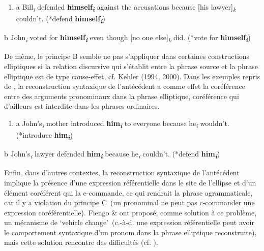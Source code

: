 \begin{enumerate}
\item \label{bkm:Ref305962748}a  Bill\textit{\textsubscript{i}} defended \textbf{himself}\textbf{\textit{\textsubscript{i}}} against the accusations because [his lawyer]\textit{\textsubscript{k}} couldn't. (*defend \textbf{himself}\textbf{\textit{\textsubscript{i}}}) 


\end{enumerate}
  b  John\textit{\textsubscript{i}} voted for \textbf{himself}\textbf{\textit{\textsubscript{i}}} even though [no one else]\textit{\textsubscript{k}} did. (*vote for \textbf{himself}\textbf{\textit{\textsubscript{i}}})

De même, le principe B semble ne pas s'appliquer dans certaines constructions elliptiques si la relation discursive qui s'établit entre la phrase source et la phrase elliptique est de type cause-effet, cf. Kehler (1994, 2000). Dans les exemples  repris de \citet{Kehler2000}, la reconstruction syntaxique de l'antécédent a comme effet la coréférence entre des arguments pronominaux dans la phrase elliptique, coréférence qui d'ailleurs est interdite dans les phrases ordinaires.


\begin{enumerate}
\item \label{bkm:Ref305962998}a  John's\textit{\textsubscript{i}} mother introduced \textbf{him}\textbf{\textit{\textsubscript{i}}} to everyone because he\textit{\textsubscript{i}} wouldn't. (*introduce \textbf{him}\textbf{\textit{\textsubscript{i}}}) 


\end{enumerate}
  b  John's\textit{\textsubscript{i}} lawyer defended \textbf{him}\textbf{\textit{\textsubscript{i}}} because he\textit{\textsubscript{i}} couldn't. (*defend \textbf{him}\textbf{\textit{\textsubscript{i}}})

Enfin, dans d'autres contextes, la reconstruction syntaxique de l'antécédent implique la présence d'une expression référentielle dans le site de l'ellipse et d'un élément coréférent qui la c-commande, ce qui rendrait la phrase agrammaticale, car il y a violation du principe C~(un pronominal ne peut pas c-commander une expression coréférentielle). Fiengo \& \citet{May1994} ont proposé, comme solution à ce problème, un mécanisme de `vehicle change'~(c.-à-d. une expression référentielle peut avoir le comportement syntaxique d'un pronom dans la phrase elliptique reconstruite), mais cette solution rencontre des difficultés (cf. \citet{Dalrymple2005}). 


